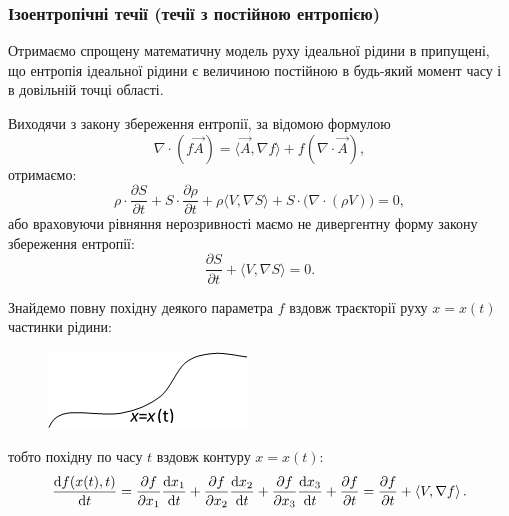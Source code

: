 % 


% 

% 



\subsubsection{Ізоентропічні течії (течії з постійною ентропією)}

Отримаємо спрощену математичну модель руху ідеальної рідини в припущені, що ентропія ідеальної рідини є величиною постійною в будь-який момент часу і в довільній точці області. \medskip

Виходячи з закону збереження ентропії, за відомою формулою
\begin{equation}
	\nabla \cdot \left( f \vec A \right) = \langle \vec A, \nabla f \rangle + f \left( \nabla \cdot \vec A \right),
\end{equation}
отримаємо:
\begin{equation}
	\rho \cdot \frac{\partial S}{\partial t} + S \cdot \frac{\partial \rho}{\partial t} + \rho \langle V, \nabla S \rangle + S \cdot \big( \nabla \cdot \left( \rho V \right) \big) = 0,
\end{equation}
або враховуючи рівняння нерозривності маємо не дивергентну форму закону збереження ентропії:
\begin{equation}
	\frac{\partial S}{\partial t} + \langle V, \nabla S \rangle = 0.
\end{equation}
	 
Знайдемо повну похідну деякого параметра $f$ вздовж траєкторії руху $x = x(t)$ частинки рідини:
\begin{figure}[H]
	\centering
	\includegraphics[]{img/11-1.png}
\end{figure}
тобто похідну по часу $t$ вздовж контуру $x = x(t)$:
\begin{equation}
	\frac{\diff f (x(t), t)}{\diff t} = \frac{\partial f}{\partial x_1} \frac{\diff x_1}{\diff t} + \frac{\partial f}{\partial x_2} \frac{\diff x_2}{\diff t} + \frac{\partial f}{\partial x_3} \frac{\diff x_3}{\diff t} + \frac{\partial f}{\partial t} = \frac{\partial f}{\partial t} + \langle V, \nabla f \rangle.
\end{equation}

